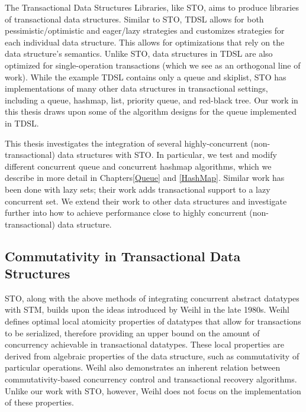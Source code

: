 The Transactional Data Structures Libraries\cite{tdsl}, like STO, aims to produce libraries of transactional data structures. Similar to STO, TDSL allows for both pessimistic/optimistic and eager/lazy strategies and customizes strategies for each individual data structure. This allows for optimizations that rely on the data structure's semantics. Unlike STO, data structures in TDSL are also optimized for single-operation transactions (which we see as an orthogonal line of work). While the example TDSL contains only a queue and skiplist, STO has implementations of many other data structures in transactional settings, including a queue, hashmap, list, priority queue, and red-black tree. Our work in this thesis draws upon some of the algorithm designs for the queue implemented in TDSL.

This thesis investigates the integration of several highly-concurrent (non-transactional) data structures with STO. In particular, we test and modify different concurrent queue \cite{queue1}\cite{queue2}\cite{queue3}\cite{queue4}\cite{queue5}\cite{flatcombining} and concurrent hashmap\cite{hm1}\cite{hm2}\cite{hm3}\cite{chm} algorithms, which we describe in more detail in Chapters\ref{Queue} and \ref{HashMap}. Similar work has been done with lazy sets\cite{lazyset}; their work adds transactional support to a lazy concurrent set. We extend their work to other data structures and investigate further into how to achieve performance close to highly concurrent (non-transactional) data structure.

\subsection{Commutativity in Transactional Data Structures}

STO, along with the above methods of integrating concurrent abstract datatypes with STM, builds upon the ideas introduced by Weihl in the late 1980s\cite{weihl}. Weihl defines optimal local atomicity properties of datatypes that allow for transactions to be serialized, therefore providing an upper bound on the amount of concurrency achievable in transactional datatypes. These local properties are derived from algebraic properties of the data structure, such as commutativity of particular operations. Weihl also demonstrates an inherent relation between commutativity-based concurrency control and transactional recovery algorithms. Unlike our work with STO, however, Weihl does not focus on the implementation of these properties.

